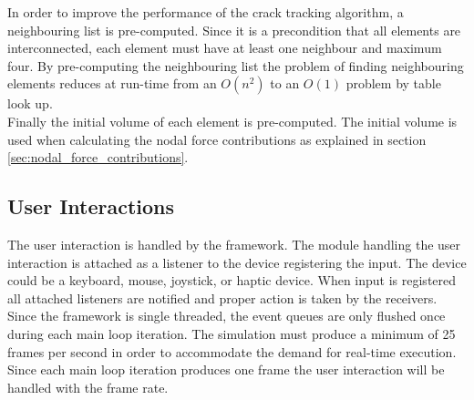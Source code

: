 %
In order to improve the performance of the crack tracking algorithm, a
neighbouring list is pre-computed. Since it is a precondition that all
elements are interconnected, each element must have at least
one neighbour and maximum four. By pre-computing the neighbouring list
the problem of finding neighbouring elements reduces at run-time from an $O(n^2)$
to an $O(1)$ problem by table look up. \\

Finally the initial volume of each element is pre-computed. The
initial volume is used when calculating the nodal 
force contributions as explained in section
\vref{sec:nodal_force_contributions}.


\subsection*{User Interactions}
The user interaction is handled by the \openengine{} framework. The module
handling the user interaction is attached as a listener to the device
registering the input. The device could be a keyboard,
mouse, joystick, or haptic device. When input is registered all
attached listeners are notified and proper action is taken by
the receivers. Since the \openengine{} framework is single
threaded, the event queues are only flushed once during each main loop
iteration. The simulation must produce a minimum of 25 frames per
second in order to accommodate the demand for real-time
execution. Since each main loop iteration produces one frame the user
interaction will be handled with the frame rate.  


